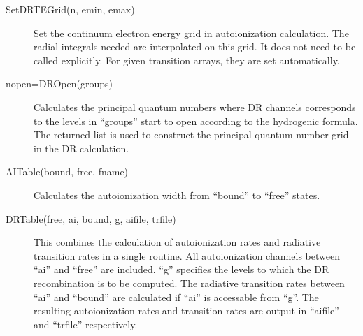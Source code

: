 \documentclass[12pt]{article}
\begin{document}
\begin{description}
\item[SetDRTEGrid(n, emin, emax)] 
Set the continuum electron energy grid in
autoionization calculation. The radial integrals needed are interpolated on
this grid. It does not need to be called explicitly. For given transition
arrays, they are set automatically. 

\item[nopen=DROpen(groups)]
Calculates the principal quantum numbers where DR channels corresponds to the
levels in ``groups'' start to open according to the hydrogenic formula. The
returned list is used to construct the 
principal quantum number grid in the DR calculation. 

\item[AITable(bound, free, fname)] Calculates the autoionization width from
``bound'' to ``free'' states. 

\item[DRTable(free, ai, bound, g, aifile, trfile)] This combines the
calculation of autoionization rates and radiative transition rates in a single
routine. All autoionization channels between ``ai'' and ``free'' are
included. ``g'' specifies the levels to which the DR recombination is to be
computed. The radiative transition rates between ``ai'' and ``bound'' are
calculated if ``ai'' is accessable from ``g''. The resulting autoionization
rates and transition rates are output in ``aifile'' and ``trfile''
respectively. 

\end{description}
\end{document}
